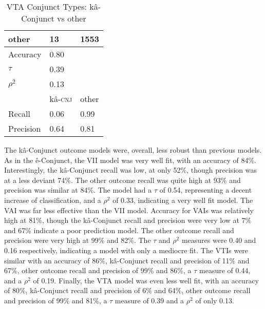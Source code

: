 \begin{table}[H]
\begin{floatrow}[2]
{\begin{tabular}{lll}
other                   & 13                & 1553                    \\
                     \midrule
                     \midrule
Accuracy             & 0.80               &                       \\
$\tau$               & 0.39               &                       \\
$\rho^{2}$           & 0.13               &                       \\
                     \midrule
                     \midrule
                     & kâ-\textsc{cnj}       & other           \\
Recall               & 0.06               & 0.99                  \\
Precision            & 0.64               & 0.81 \\
                \bottomrule
                \end{tabular}}
    {\caption{VTA Conjunct Types: kâ-Conjunct vs other}
      \label{vtaivcms}}
  \end{floatrow}
\end{table}%

The kâ-Conjunct outcome models were, overall, less robust than previous models. As in the ê-Conjunct, the VII model was very well fit, with an accuracy of 84\%. Interestingly, the kâ-Conjunct recall was low, at only 52\%, though precision was at a less deviant 74\%. The other outcome recall was quite high at 93\% and precision was similar at 84\%. The model had a $\tau$ of 0.54, representing a decent increase of classification, and a $\rho^{2}$ of 0.33, indicating a very well fit model. The VAI was far less effective than the VII model. Accuracy for VAIs was relatively high at 81\%, though the kâ-Conjunct recall and precision were very low at 7\% and 67\% indicate a poor prediction model. The other outcome recall and precision were very high at 99\% and 82\%. The $\tau$ and $\rho^{2}$ measures were 0.40 and 0.16 respectively, indicating a model with only a mediocre fit. The VTIs were similar with an accuracy of 86\%, kâ-Conjunct recall and precision of 11\% and 67\%, other outcome recall and precision of 99\% and 86\%, a $\tau$ measure of 0.44, and a $\rho^{2}$ of 0.19. Finally, the VTA model was even less well fit, with an accuracy of 80\%, kâ-Conjunct recall and precision of 6\% and 64\%, other outcome recall and precision of 99\% and 81\%, a $\tau$ measure of 0.39 and a $\rho^{2}$ of only 0.13. 




